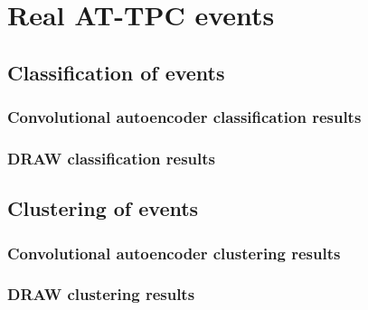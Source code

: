 \section{Real AT-TPC events}

\subsection{Classification of events} 
\subsubsection{Convolutional autoencoder classification results}
\subsubsection{DRAW classification results}
\subsection{Clustering of events}
\subsubsection{Convolutional autoencoder clustering results}
\subsubsection{DRAW clustering results}